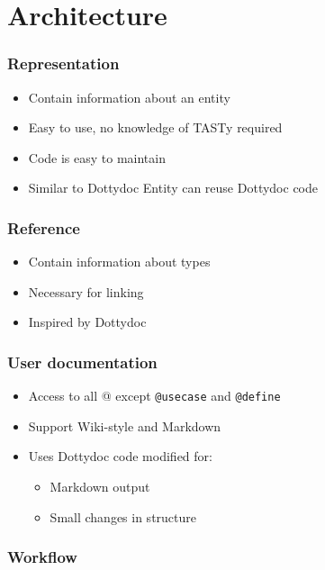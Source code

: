 \documentclass{beamer}
\begin{document}
\section{Architecture}

\begin{frame}
  \frametitle{Representation}
  \pause
  \begin{itemize}
    \item Contain information about an entity \pause
    \item Easy to use, no knowledge of TASTy required \pause
    \item Code is easy to maintain \pause
    \item Similar to Dottydoc Entity \textrightarrow can reuse Dottydoc code
  \end{itemize}
\end{frame}

\begin{frame}
  \frametitle{Reference}
  \pause
  \begin{itemize}
    \item Contain information about types \pause
    \item Necessary for linking \pause
    \item Inspired by Dottydoc
  \end{itemize}
\end{frame}

\begin{frame}[fragile]
  \frametitle{User documentation}
  \pause
  \begin{itemize}
    \item Access to all @ except \texttt{@usecase} and \texttt{@define}\pause
    \item Support Wiki-style and Markdown \pause
    \item Uses Dottydoc code modified for:
    \begin{itemize}
      \item Markdown output
      \item Small changes in structure 
    \end{itemize}
  \end{itemize}
\end{frame}

\begin{frame}
  \frametitle{Workflow}
  \pause
  \begin{center}
  \end{center}
\end{frame}
\end{document}
